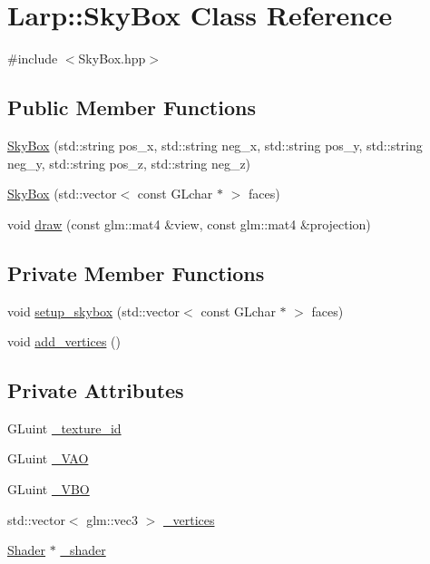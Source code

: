 \hypertarget{classLarp_1_1SkyBox}{}\section{Larp\+:\+:Sky\+Box Class Reference}
\label{classLarp_1_1SkyBox}


{\ttfamily \#include $<$Sky\+Box.\+hpp$>$}

\subsection*{Public Member Functions}
\begin{DoxyCompactItemize}
\item 
\hyperlink{classLarp_1_1SkyBox_a61ce9716a72990425379dffe8a905031}{Sky\+Box} (std\+::string pos\+\_\+x, std\+::string neg\+\_\+x, std\+::string pos\+\_\+y, std\+::string neg\+\_\+y, std\+::string pos\+\_\+z, std\+::string neg\+\_\+z)
\item 
\hyperlink{classLarp_1_1SkyBox_a9e8363e97b142013cad3cca5e4b830da}{Sky\+Box} (std\+::vector$<$ const G\+Lchar $\ast$ $>$ faces)
\item 
void \hyperlink{classLarp_1_1SkyBox_a6afa95d42fb5796a0583753ab0c4ea50}{draw} (const glm\+::mat4 \&view, const glm\+::mat4 \&projection)
\end{DoxyCompactItemize}
\subsection*{Private Member Functions}
\begin{DoxyCompactItemize}
\item 
void \hyperlink{classLarp_1_1SkyBox_a5fd9c148aabb7a66bbb9e93ec424da0c}{setup\+\_\+skybox} (std\+::vector$<$ const G\+Lchar $\ast$ $>$ faces)
\item 
void \hyperlink{classLarp_1_1SkyBox_a2760c45ebde25cf706ee84ba5bd867bd}{add\+\_\+vertices} ()
\end{DoxyCompactItemize}
\subsection*{Private Attributes}
\begin{DoxyCompactItemize}
\item 
G\+Luint \hyperlink{classLarp_1_1SkyBox_a4e5d81c88ec56b2066a1fd12c63e786c}{\+\_\+texture\+\_\+id}
\item 
G\+Luint \hyperlink{classLarp_1_1SkyBox_a0f81a6f64c7ece2f3d0738ebb0dce278}{\+\_\+\+V\+AO}
\item 
G\+Luint \hyperlink{classLarp_1_1SkyBox_a03974877d7babf869dc59f0ca16be563}{\+\_\+\+V\+BO}
\item 
std\+::vector$<$ glm\+::vec3 $>$ \hyperlink{classLarp_1_1SkyBox_ab4174c418ecd405b91f6c3ee70edf1f7}{\+\_\+vertices}
\item 
\hyperlink{classLarp_1_1Shader}{Shader} $\ast$ \hyperlink{classLarp_1_1SkyBox_a6ade008779816dcf2bacacf0d5c228a1}{\+\_\+shader}
\end{DoxyCompactItemize}


